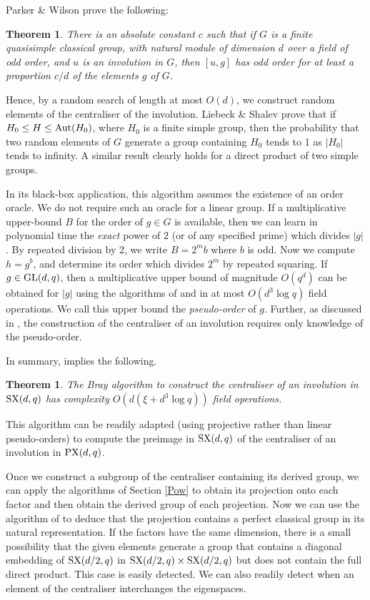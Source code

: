 \documentclass[12pt]{article}
\newtheorem{theorem}[definition]{Theorem}
\def\GL{{\rm GL}}
\def\SX{{\rm SX}}
\def\PX{{\rm PX}}
\begin{document}
Parker \& Wilson \cite{PW05} prove the following:
\begin{theorem}\label{clasthm}
There is an absolute constant $c$ such that if $G$ is a finite
quasisimple classical group, with natural module
of dimension $d$ over a field of odd order,
and $u$ is an involution in $G$, then $[u,g]$ has odd order
for at least a proportion $c/d$ of the elements $g$ of $G$.
\end{theorem}

Hence, by a random search of length at most $O(d)$, we construct
random elements of the centraliser of the involution. 
Liebeck \& Shalev \cite{lish} prove that if $H_0 \leq H \leq {\rm Aut}(H_0)$,
where $H_0$ is a finite simple group, then the probability that
two random elements of $G$ generate a group containing 
$H_0$ tends to 1 as $|H_0|$ tends to infinity. A similar
result clearly holds for a direct product of two simple groups.

In its black-box application, this algorithm 
assumes the existence of an order oracle.
We do not require such an oracle for a linear group.
If a multiplicative upper-bound $B$ for the
order of $g \in G$ is available,
then we can learn in polynomial time
the {\it exact} power of $2$ (or of any specified prime)
which divides $|g|$.
By repeated division by 2, we write $B = 2^m b$ where
$b$ is odd. Now we compute $h = g^{b}$, and determine
its order which divides $2^m$ by repeated squaring.
If $g \in \GL(d, q)$, then a multiplicative upper 
bound of magnitude $O(q^d)$ can be obtained for $|g|$
using the algorithms of 
\cite{CLG97} and \cite{Storjohann98}
in at most $O(d^3 \log q)$
field operations.  We call this upper bound the
{\it pseudo-order} of $g$.
Further, as discussed in \cite{Ryba-paper},
the construction of the centraliser
of an involution requires only
knowledge of the pseudo-order.

In summary, \cite[Theorem 7]{Ryba-paper} implies the following.
\begin{theorem}
The Bray algorithm to construct the centraliser
of an involution in $\SX(d, q)$ has complexity
$O(d(\xi + d^3 \log q))$ field operations.
\end{theorem}

This algorithm can be readily adapted (using projective rather
than linear pseudo-orders) to compute the preimage in 
$\SX(d, q)$ of the centraliser of an involution in $\PX(d, q)$.

Once we construct a subgroup of  the centraliser containing
its derived group, we can apply 
the algorithms of Section \ref{Pow} to obtain its projection 
onto each factor and then obtain the derived group of each projection.
Now we can use the algorithm of \cite{NP} to deduce that 
the projection contains a perfect classical group in its 
natural representation.  If the factors have the
same dimension, there is a small possibility that the given elements
generate a group that contains a diagonal embedding of $\SX(d/2,q)$
in $\SX(d/2,q)\times\SX(d/2,q)$ but does not contain the full direct product.
This case is easily detected.  We can also readily detect when an element
of the centraliser interchanges the eigenspaces.
\end{document}
